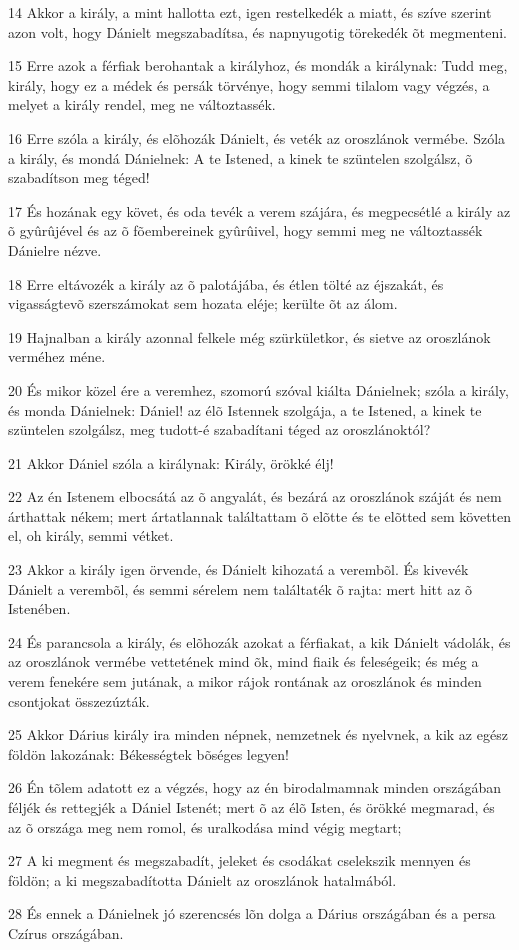 \par 14 Akkor a király, a mint hallotta ezt, igen restelkedék a miatt, és szíve szerint azon volt, hogy Dánielt megszabadítsa, és napnyugotig törekedék õt megmenteni.
\par 15 Erre azok a férfiak berohantak a királyhoz, és mondák a királynak: Tudd meg, király, hogy ez a médek és persák törvénye, hogy semmi tilalom vagy végzés, a melyet a király rendel, meg ne változtassék.
\par 16 Erre szóla a király, és elõhozák Dánielt, és veték az oroszlánok vermébe. Szóla a király, és mondá Dánielnek: A te Istened, a kinek te szüntelen szolgálsz, õ szabadítson meg téged!
\par 17 És hozának egy követ, és oda tevék a verem szájára, és megpecsétlé a király az õ gyûrûjével és az õ fõembereinek gyûrûivel, hogy semmi meg ne változtassék Dánielre nézve.
\par 18 Erre eltávozék a király az õ palotájába, és étlen tölté az éjszakát, és vigasságtevõ szerszámokat sem hozata eléje; kerülte õt az álom.
\par 19 Hajnalban a király azonnal felkele még szürkületkor, és sietve az oroszlánok verméhez méne.
\par 20 És mikor közel ére a veremhez, szomorú szóval kiálta Dánielnek; szóla a király, és monda Dánielnek: Dániel! az élõ Istennek szolgája, a te Istened, a kinek te szüntelen szolgálsz, meg tudott-é szabadítani téged az oroszlánoktól?
\par 21 Akkor Dániel szóla a királynak: Király, örökké élj!
\par 22 Az én Istenem elbocsátá az õ angyalát, és bezárá az oroszlánok száját és nem árthattak nékem; mert ártatlannak találtattam õ elõtte és te elõtted sem követten el, oh király, semmi vétket.
\par 23 Akkor a király igen örvende, és Dánielt kihozatá a verembõl. És kivevék Dánielt a verembõl, és semmi sérelem nem  találtaték õ rajta: mert hitt az õ Istenében.
\par 24 És parancsola a király, és elõhozák azokat a férfiakat, a kik Dánielt vádolák, és az oroszlánok vermébe vettetének mind õk, mind fiaik és feleségeik; és még a verem fenekére sem jutának, a mikor rájok rontának az oroszlánok és minden csontjokat összezúzták.
\par 25 Akkor Dárius király ira minden népnek, nemzetnek és nyelvnek, a kik az egész földön lakozának: Békességtek bõséges legyen!
\par 26 Én tõlem adatott ez a végzés, hogy az én birodalmamnak minden országában féljék és rettegjék a Dániel Istenét; mert õ az élõ Isten, és örökké megmarad, és az õ országa meg nem romol, és uralkodása mind végig megtart;
\par 27 A ki megment és megszabadít, jeleket és csodákat cselekszik mennyen és földön; a ki megszabadította Dánielt az oroszlánok hatalmából.
\par 28 És ennek a Dánielnek jó szerencsés lõn dolga a Dárius országában és a persa Czírus országában.

